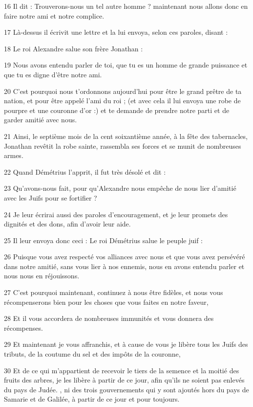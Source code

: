 \par 16 Il dit : Trouverons-nous un tel autre homme ? maintenant nous allons donc en faire notre ami et notre complice.
\par 17 Là-dessus il écrivit une lettre et la lui envoya, selon ces paroles, disant :
\par 18 Le roi Alexandre salue son frère Jonathan :
\par 19 Nous avons entendu parler de toi, que tu es un homme de grande puissance et que tu es digne d'être notre ami.
\par 20 C'est pourquoi nous t'ordonnons aujourd'hui pour être le grand prêtre de ta nation, et pour être appelé l'ami du roi ; (et avec cela il lui envoya une robe de pourpre et une couronne d'or :) et te demande de prendre notre parti et de garder amitié avec nous.
\par 21 Ainsi, le septième mois de la cent soixantième année, à la fête des tabernacles, Jonathan revêtit la robe sainte, rassembla ses forces et se munit de nombreuses armes.
\par 22 Quand Démétrius l'apprit, il fut très désolé et dit :
\par 23 Qu'avons-nous fait, pour qu'Alexandre nous empêche de nous lier d'amitié avec les Juifs pour se fortifier ?
\par 24 Je leur écrirai aussi des paroles d'encouragement, et je leur promets des dignités et des dons, afin d'avoir leur aide.
\par 25 Il leur envoya donc ceci : Le roi Démétrius salue le peuple juif :
\par 26 Puisque vous avez respecté vos alliances avec nous et que vous avez persévéré dans notre amitié, sans vous lier à nos ennemis, nous en avons entendu parler et nous nous en réjouissons.
\par 27 C'est pourquoi maintenant, continuez à nous être fidèles, et nous vous récompenserons bien pour les choses que vous faites en notre faveur,
\par 28 Et il vous accordera de nombreuses immunités et vous donnera des récompenses.
\par 29 Et maintenant je vous affranchis, et à cause de vous je libère tous les Juifs des tributs, de la coutume du sel et des impôts de la couronne,
\par 30 Et de ce qui m'appartient de recevoir le tiers de la semence et la moitié des fruits des arbres, je les libère à partir de ce jour, afin qu'ils ne soient pas enlevés du pays de Judée. , ni des trois gouvernements qui y sont ajoutés hors du pays de Samarie et de Galilée, à partir de ce jour et pour toujours.
